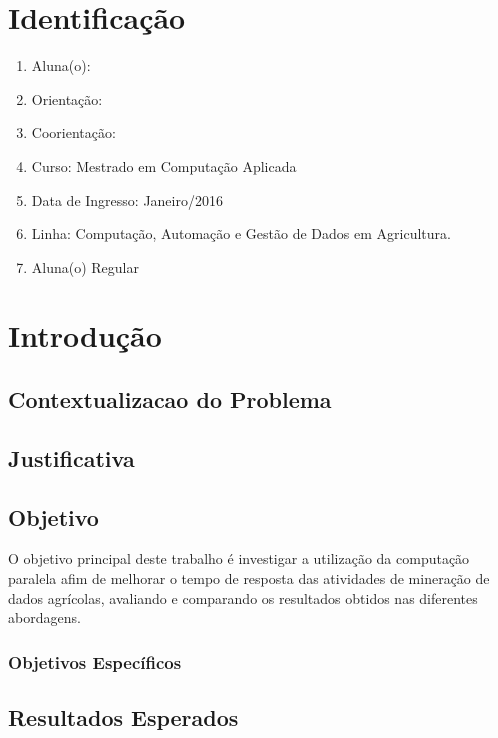 \chapter*{Identificação}

\begin{enumerate}

\item Aluna(o): 

\item Orientação: 

\item Coorientação: 

\item Curso: Mestrado em Computação Aplicada

\item Data de Ingresso: Janeiro/2016

\item Linha: Computação, Automação e Gestão de Dados em Agricultura.

\item Aluna(o) Regular

\end{enumerate}

\chapter{Introdução}



\section{Contextualizacao do Problema}
\lipsum[1]

\section{Justificativa}
\lipsum[1]
\section{Objetivo}
O objetivo principal deste trabalho é investigar a utilização da computação paralela afim de melhorar o tempo de resposta das atividades de mineração de dados agrícolas, avaliando e comparando os resultados obtidos nas diferentes abordagens. 
\subsection{Objetivos Específicos}

\section{Resultados Esperados}